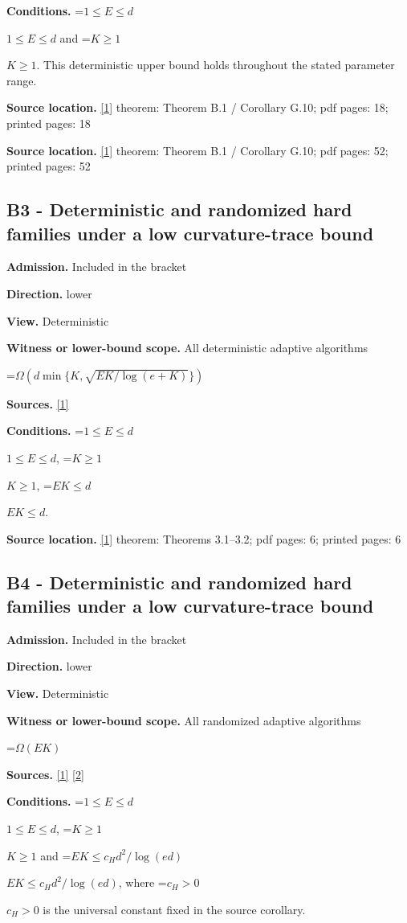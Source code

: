\documentclass[10pt,a4paper]{article}
\newcommand{\AtlasMath}[1]{\par\begingroup\centering\setbox0=\hbox{$\displaystyle #1$}\ifdim\wd0>1.4\linewidth\typeout{ATLAS WIDE FORMULA: \the\wd0}\fi\ifdim\wd0>\linewidth\resizebox{\linewidth}{!}{\box0}\else\box0\fi\par\endgroup}
\newcommand{\AtlasInlineMath}[1]{\begingroup\setbox0=\hbox{$#1$}\ifdim\wd0>.4\linewidth\endgroup\AtlasMath{#1}\else\endgroup$#1$\fi}
\begin{document}
\textbf{Conditions.} \AtlasInlineMath{1\le E\le d} and \AtlasInlineMath{K\ge1}. This deterministic upper bound holds throughout the stated parameter range.

\textbf{Source location.} \href{https://arxiv.org/pdf/2610.27550v2}{[1]} theorem: Theorem B.1 / Corollary G.10; pdf pages: 18; printed pages: 18

\textbf{Source location.} \href{https://arxiv.org/pdf/2610.27550v2}{[1]} theorem: Theorem B.1 / Corollary G.10; pdf pages: 52; printed pages: 52

\subsection{B3 - Deterministic and randomized hard families under a low curvature-trace bound}
\textbf{Admission.} Included in the bracket

\textbf{Direction.} lower

\textbf{View.} Deterministic

\textbf{Witness or lower-bound scope.} All deterministic adaptive algorithms

\AtlasMath{\Omega(d\min\{K,\sqrt{EK/\log(e+K)}\})}
\textbf{Sources.} \href{https://arxiv.org/pdf/2610.27550v2}{[1]}

\textbf{Conditions.} \AtlasInlineMath{1\le E\le d}, \AtlasInlineMath{K\ge1}, \AtlasInlineMath{EK\le d}.

\textbf{Source location.} \href{https://arxiv.org/pdf/2610.27550v2}{[1]} theorem: Theorems 3.1--3.2; pdf pages: 6; printed pages: 6

\subsection{B4 - Deterministic and randomized hard families under a low curvature-trace bound}
\textbf{Admission.} Included in the bracket

\textbf{Direction.} lower

\textbf{View.} Deterministic

\textbf{Witness or lower-bound scope.} All randomized adaptive algorithms

\AtlasMath{\Omega(EK)}
\textbf{Sources.} \href{https://arxiv.org/pdf/2610.27550v2}{[1]} \href{https://arxiv.org/html/2610.19652v1}{[2]}

\textbf{Conditions.} \AtlasInlineMath{1\le E\le d}, \AtlasInlineMath{K\ge1} and \AtlasInlineMath{EK\le c_Hd^2/\log(ed)}, where \AtlasInlineMath{c_H>0} is the universal constant fixed in the source corollary.
\end{document}
